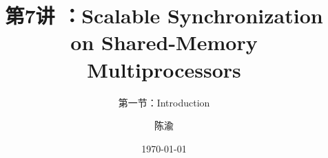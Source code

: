 


\title[第7讲]{第7讲 ：Scalable Synchronization on Shared-Memory Multiprocessors} %
\subtitle{第一节：Introduction }
\author{陈渝} %
\date{\today} %





\begin{frame}
\titlepage %
\end{frame}

